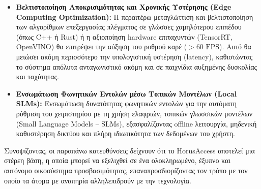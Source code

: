 \documentclass[twoside, a4paper, 11pt]{article}
\begin{document}
\begin{itemize}
    \item \textbf{Βελτιστοποίηση Αποκρισιμότητας και Χρονικής Υστέρησης (Edge Computing Optimization):} Η περαιτέρω μεταγλώττιση και βελτιστοποίηση των αλγορίθμων επεξεργασίας πλέγματος σε γλώσσες χαμηλότερου επιπέδου (όπως C++ ή Rust) ή η αξιοποίηση hardware επιταχυντών (TensorRT, OpenVINO) θα επιτρέψει την αύξηση του ρυθμού καρέ ($>60 \text{ FPS}$). Αυτό θα μειώσει ακόμη περισσότερο την υπολογιστική υστέρηση (latency), καθιστώντας το σύστημα απόλυτα ανταγωνιστικό ακόμη και σε παιχνίδια αυξημένης δυσκολίας και ταχύτητας.

    \item \textbf{Ενσωμάτωση Φωνητικών Εντολών μέσω Τοπικών Μοντέλων (Local SLMs):} Ενσωμάτωση δυνατότητας φωνητικών εντολών για την αυτόματη ρύθμιση του χειριστηρίου με τη χρήση ελαφριών, τοπικών γλωσσικών μοντέλων (Small Language Models -- SLMs), εξασφαλίζοντας offline λειτουργία, μηδενική καθυστέρηση δικτύου και πλήρη ιδιωτικότητα των δεδομένων του χρήστη.
\end{itemize}

Συνοψίζοντας, οι παραπάνω κατευθύνσεις δείχνουν ότι το HorusAccess αποτελεί μια στέρεη βάση, η οποία μπορεί να εξελιχθεί σε ένα ολοκληρωμένο, έξυπνο και αυτόνομο οικοσύστημα προσβασιμότητας, επαναπροσδιορίζοντας τον τρόπο με τον οποίο τα άτομα με αναπηρία αλληλεπιδρούν με την τεχνολογία. 


\clearpage
{}
\renewcommand{\refname}{Βιβλιογραφία}
\end{document}
